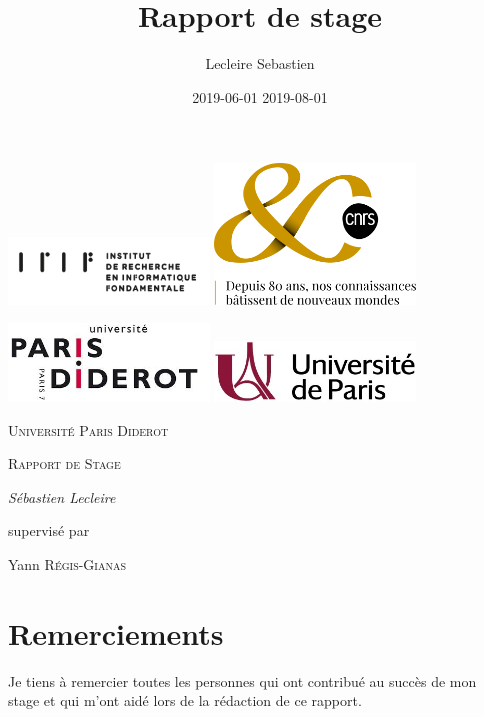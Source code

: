 \documentclass{article}
\title{Rapport de stage}
\date{2019-06-01 2019-08-01}
\author{Lecleire Sebastien}
\begin{document}
\begin{titlepage}
	\centering
	\includegraphics[width=0.4\textwidth]{irif_horizontal}
	\includegraphics[width=0.4\textwidth]{Logo80ANS_OR}\par\vspace{1cm}
	\includegraphics[width=0.4\textwidth]{logop7}
	\includegraphics[width=0.4\textwidth]{Universite_Paris_logo_horizontal}\par\vspace{1cm}
	{\scshape\LARGE Université Paris Diderot \par}
	\vspace{1cm}
	{\scshape\Large Rapport de Stage\par}
	\vspace{1.5cm}
	{\Large\itshape Sébastien Lecleire\par}
	\vfill
	supervisé par\par
	Yann \textsc{Régis-Gianas}

	\vfill
\end{titlepage}


\newpage

\tableofcontents
\newpage

\section{Remerciements}
Je tiens à remercier toutes les personnes qui ont contribué au succès de mon stage et qui m'ont aidé lors de la rédaction de ce rapport.
\end{document}
